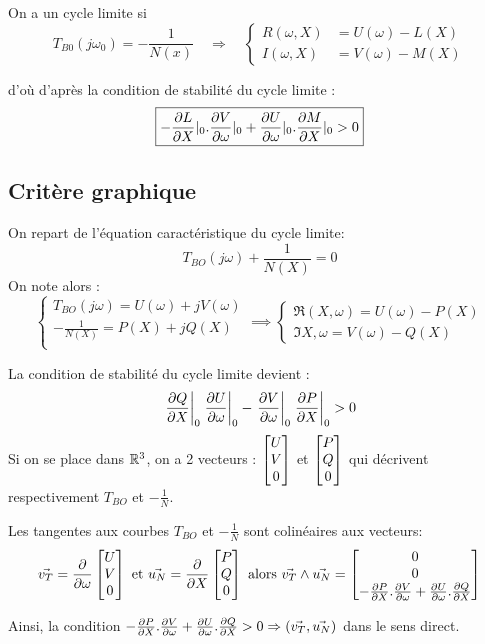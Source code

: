 \documentclass[main.tex]{subfiles}
\begin{document}
On a un cycle limite si
\[ T_{B0}(j\omega_0) = -\frac{1}{N(x)} \quad \Rightarrow \quad
  \begin{cases}
R(\omega,X) & = U(\omega) - L(X)\\I(\omega,X) & = V(\omega) - M(X)
\end{cases}
\]

d'où d'après la condition de stabilité du cycle limite :
\[\boxed{-\derivp[L]{X}|_0.\derivp[V]{\omega}|_0 + \derivp[U]{\omega}|_0.\derivp[M]{X}|_0 > 0}\]

\subsection{Critère graphique}
On repart de l'équation caractéristique du cycle limite:
\[
  T_{BO}(j\omega) + \frac{1}{N(X)} = 0
\]
On note alors :
\[
  \begin{cases}
    T_{BO}(j\omega) = U(\omega)+j V(\omega) \\
    -\frac{1}{N(X)} = P(X)+j Q(X) \\
  \end{cases}
  \implies
  \begin{cases}
    \Re(X,\omega) = U(\omega)-P(X)\\
    \Im{X,\omega} = V(\omega)-Q(X)
  \end{cases}
\]

La condition de stabilité du cycle limite devient :
\[
  \left.\derivp[Q]{X}\right|_0 \left.\derivp[U]{\omega}\right|_0 - \left.\derivp[V]{\omega}\right|_0 \left.\derivp[P]{X}\right|_0 >0
\]
Si on se place dans $\R^3$, on a 2 vecteurs : $\vect{U\\V\\0}$ et $\vect{P\\Q\\0}$ qui décrivent respectivement $T_{BO}$ et $-\frac{1}{N}$.

Les tangentes aux courbes $T_{BO}$ et $-\frac{1}{N}$ sont colinéaires aux vecteurs:
\[\vec{v_T} = \derivp[]{\omega}\vect{U\\V\\0} \text{ et } \vec{u_N}=\derivp[]{X}\vect{P\\Q\\0} \text{ alors }
\vec{v_T}\wedge\vec{u_N} = \vect{0\\0\\-\derivp[P]{X}.\derivp[V]{\omega} + \derivp[U]{\omega}.\derivp[Q]{X}}\]

Ainsi, la condition $-\derivp[P]{X}.\derivp[V]{\omega} + \derivp[U]{\omega}.\derivp[Q]{X}>0 \Rightarrow (\vec{v_T},\vec{u_N})$ dans le sens direct.
\end{document}
